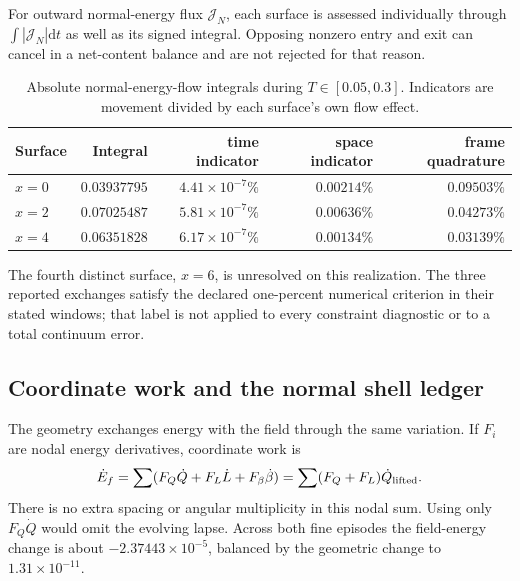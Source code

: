 \documentclass[11pt]{article}
\newcommand{\dd}{\mathrm{d}}
\begin{document}
For outward normal-energy flux $\mathcal J_N$, each surface is assessed
individually through $\int|\mathcal J_N|\dd t$ as well as its signed
integral. Opposing nonzero entry and exit can cancel in a net-content
balance and are not rejected for that reason.
\begin{table}[tbp]
\centering
\caption{Absolute normal-energy-flow integrals during $T\in[0.05,0.3]$.
Indicators are movement divided by each surface's own flow effect.}
\label{tab:flow}
\begin{tabular}{lrrrr}
\toprule
Surface & Integral & time indicator & space indicator & frame quadrature\\
\midrule
$x=0$ & $0.03937795$ & $4.41\times10^{-7}\%$ & $0.00214\%$ & $0.09503\%$\\
$x=2$ & $0.07025487$ & $5.81\times10^{-7}\%$ & $0.00636\%$ & $0.04273\%$\\
$x=4$ & $0.06351828$ & $6.17\times10^{-7}\%$ & $0.00134\%$ & $0.03139\%$\\
\bottomrule
\end{tabular}
\end{table}
The fourth distinct surface, $x=6$, is unresolved on this realization.
The three reported exchanges satisfy the declared one-percent numerical
criterion in their stated windows; that label is not applied to every
constraint diagnostic or to a total continuum error.

\subsection{Coordinate work and the normal shell ledger}\label{sec:ledger}
The geometry exchanges energy with the field through the same variation.
If $F_i$ are nodal energy derivatives, coordinate work is
\begin{equation}\label{eq:coordinatework}
\dot E_f=\sum(F_Q\dot Q+F_L\dot L+F_\beta\dot\beta)
=\sum(F_Q+F_L)\dot Q_{\rm lifted}.
\end{equation}
There is no extra spacing or angular multiplicity in this nodal sum.
Using only $F_Q\dot Q$ would omit the evolving lapse. Across both fine
episodes the field-energy change is about $-2.37443\times10^{-5}$,
balanced by the geometric change to $1.31\times10^{-11}$.
\end{document}
